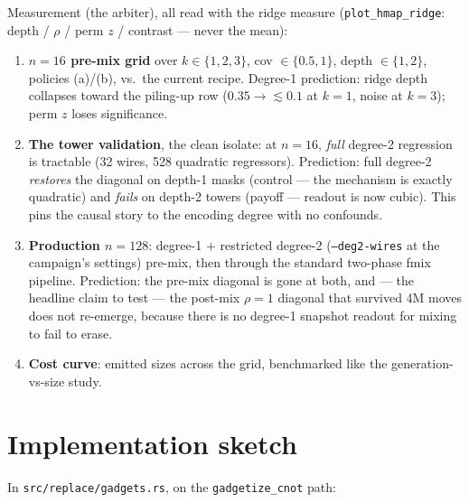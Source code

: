 \documentclass[11pt]{article}
\newcommand{\code}[1]{\texttt{#1}}
\begin{document}
Measurement (the arbiter), all read with the ridge measure
(\code{plot\_hmap\_ridge}: depth / $\rho$ / perm $z$ / contrast --- never
the mean):
\begin{enumerate}
\item \textbf{$n{=}16$ pre-mix grid} over $k \in \{1,2,3\}$, cov $\in
\{0.5, 1\}$, depth $\in \{1,2\}$, policies (a)/(b), vs.\ the current
recipe. Degree-1 prediction: ridge depth collapses toward the piling-up
row ($0.35 \to \lesssim 0.1$ at $k{=}1$, noise at $k{=}3$); perm $z$
loses significance.
\item \textbf{The tower validation}, the clean isolate: at $n{=}16$,
\emph{full} degree-2 regression is tractable (32 wires, 528 quadratic
regressors). Prediction: full degree-2 \emph{restores} the diagonal on
depth-1 masks (control --- the mechanism is exactly quadratic) and
\emph{fails} on depth-2 towers (payoff --- readout is now cubic). This
pins the causal story to the encoding degree with no confounds.
\item \textbf{Production $n{=}128$}: degree-1 $+$ restricted degree-2
(\code{--deg2-wires} at the campaign's settings) pre-mix, then through
the standard two-phase fmix pipeline. Prediction: the pre-mix diagonal is
gone at both, and --- the headline claim to test --- the post-mix
$\rho{=}1$ diagonal that survived 4M moves does not re-emerge, because
there is no degree-1 snapshot readout for mixing to fail to erase.
\item \textbf{Cost curve}: emitted sizes across the grid, benchmarked
like the generation-vs-size study.
\end{enumerate}

\section{Implementation sketch}

In \code{src/replace/gadgets.rs}, on the \code{gadgetize\_cnot} path:
\end{document}
